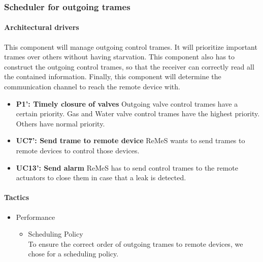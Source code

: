 \subsubsection{Scheduler for outgoing trames}
\paragraph{Architectural drivers}
This component will manage outgoing control trames. It will prioritize important
	trames over others without having starvation. This component also has to
	construct the outgoing control trames, so that the receiver can correctly
	read all the contained information. Finally, this component will determine
	the communication channel to reach the remote device with.
\begin{itemize}
	\item \textbf{P1': Timely closure of valves}
	Outgoing valve control trames have a certain priority. Gas and Water valve control
		trames have the highest priority. Others have normal priority.
	\item \textbf{UC7': Send trame to remote device}
	ReMeS wants to send trames to remote devices to control those devices.
	\item \textbf{UC13': Send alarm}
	ReMeS has to send control trames to the remote actuators to close them in case that a leak is detected.
\end{itemize}


\paragraph{Tactics}
\begin{itemize}
	\item Performance
	\begin{itemize}
		\item Scheduling Policy \\
		To ensure the correct order of outgoing trames to remote devices,
			we chose for a scheduling policy.
	\end{itemize}
\end{itemize}


